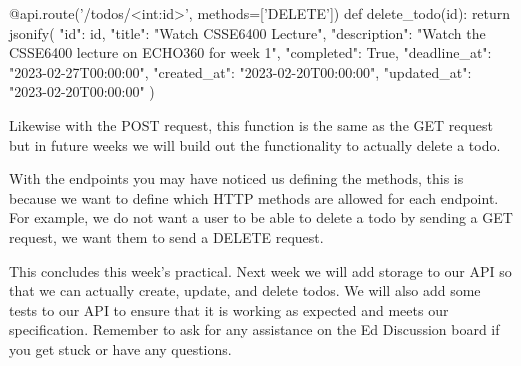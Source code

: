 \documentclass{csse4400}
\begin{document}
\begin{code}[language=python]{}
  @api.route('/todos/<int:id>', methods=['DELETE'])
  def delete_todo(id):
      return jsonify({
        "id": id,
        "title": "Watch CSSE6400 Lecture",
        "description": "Watch the CSSE6400 lecture on ECHO360 for week 1",
        "completed": True,
        "deadline_at": "2023-02-27T00:00:00",
        "created_at": "2023-02-20T00:00:00",
        "updated_at": "2023-02-20T00:00:00"
      })
\end{code}

Likewise with the POST request, this function is the same as the GET request but in future weeks we will build out the functionality to actually delete a todo.

With the endpoints you may have noticed us defining the methods, this is because we want to define which HTTP methods are allowed for each endpoint. For example, we do not want a user to be able to delete a todo by sending a GET request, we want them to send a DELETE request.

This concludes this week's practical.
Next week we will add storage to our API so that we can actually create, update, and delete todos.
We will also add some tests to our API to ensure that it is working as expected and meets our specification.
Remember to ask for any assistance on the Ed Discussion board if you get stuck or have any questions.

%
%
\end{document}
